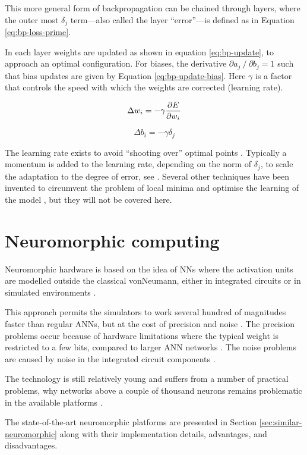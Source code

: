 \documentclass[report.tex]{subfiles}
\begin{document}
This more general form of backpropagation can be chained through layers, where
the outer most $\delta_j$ term---also called the layer ``error''---is defined 
as in Equation \ref{eq:bp-loss-prime}.

In each layer weights are updated as shown in equation \ref{eq:bp-update},
to approach an optimal configuration.
For biases, the derivative $\partial a_j \mathbin{/} \partial b_j = 1$ such that bias
updates are given by Equation \ref{eq:bp-update-bias}.
Here $\gamma$ is a factor that controls the speed with which the weights
are corrected (learning rate). 

\begin{equation}
  \Delta w_i = -\gamma {\partial E \over \partial w_i}
  \label{eq:bp-update}
\end{equation}

\begin{equation}
  \Delta b_i = -\gamma \delta_j
  \label{eq:bp-update-bias}
\end{equation}

The learning rate exists to avoid ``shooting over'' optimal points
\cite{Russel2007}.
Typically a momentum is added to the learning rate, depending on the norm of
$\delta_j$, to scale the adaptation to the degree of error,
see \cite{Sutskever2013, LeCun1998}. 
Several other techniques have been invented to circumvent the problem of 
local minima and optimise the learning of the model \cite{LeCun1998,
Schmidhuber2014}, but they will not be covered here.

\section{Neuromorphic computing}
Neuromorphic hardware is based on the idea of \gls{NN}s where the activation
units are modelled outside the classical \gls{vonNeumann}, either in 
integrated circuits or in simulated environments \cite{Albada2018,Blundell2018,Schmitt2017}.

This approach permits the simulators to work several hundred of magnitudes
faster than regular \gls{ANN}s, but at the cost of precision and noise
\cite{Indiveri2015, Schmitt2017}.
The precision problems occur because of hardware limitations where the typical
weight is restricted to a few bits, compared to larger \gls{ANN} networks
\cite{Indiveri2015, Lin2018}.
The noise problems are caused by noise in the integrated circuit components 
\cite{Lin2018, Pfeil2013}.

The technology is still relatively young and suffers from a number
of practical problems, why networks above a couple of thousand neurons remains
problematic in the available platforms \cite{Schmitt2017}.

The state-of-the-art neuromorphic platforms are presented in Section
\ref{sec:similar-neuromorphic} along with their implementation details,
advantages, and disadvantages.

\end{document}
